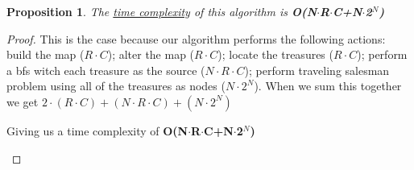 \documentclass[12pt]{article}
\newtheorem{proposition}[theorem]{Proposition}
\begin{document}
\begin{proposition}
\label{numq}
The \underline{time complexity} of this algorithm is \textbf{O(N$\cdot$R$\cdot$C+N$\cdot$2$^N$)}
\end{proposition}

\begin{proof}
This is the case because our algorithm performs the following actions: build the map ($R\cdot C$);
alter the map ($R\cdot C$); locate the treasures ($R\cdot C$); perform a bfs witch each treasure as
the source ($N\cdot R\cdot C$); perform traveling salesman problem using all of the treasures as
nodes ($N\cdot 2^N$).  When we sum this together we get $2\cdot(R\cdot C) + (N\cdot R\cdot C) +
(N\cdot 2^N)$
\begin{center}
    Giving us a time complexity of \textbf{O(N$\cdot$R$\cdot$C+N$\cdot$2$^N$)}
\end{center}
\end{proof}

\end{document}
